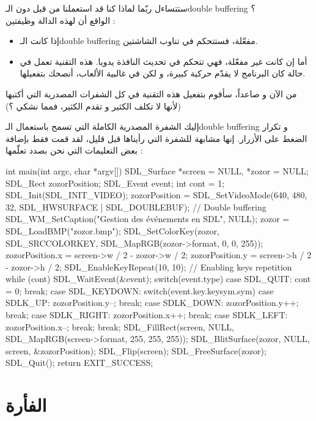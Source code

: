 ستتساءل ربّما لماذا كنا قد استعملنا
من قبل دون الـ\textenglish{double buffering} ؟\\
الواقع أن لهذه الدالة وظيفتين :

\begin{itemize}
	\item إذا كانت الـ\textenglish{double buffering}
	مفعّلة، فستتحكم في تناوب الشاشتين.
	\item أما إن كانت غير مفعّلة، فهي تتحكم في تحديث النافذة يدويا. هذه التقنية تعمل في حالة كان البرنامج لا يقدّم حركية كبيرة، و لكن في غالبية الألعاب، أنصحك بتفعيلها.
\end{itemize}

من الآن و صاعداً، سأقوم بتفعيل هذه التقنية في كل الشفرات المصدرية التي أكتبها (لأنها لا تكلف الكثير و تقدم الكثير، فمما نشكي ؟)

إليك الشفرة المصدرية الكاملة التي تسمح باستعمال الـ\textenglish{double buffering}
و تكرار الضغط على الأزرار. إنها مشابهة للشفرة التي رأيناها قبل قليل، لقد قمت فقط بإضافة بعض التعليمات التي نحن بصدد تعلّمها :

\begin{Csource}
int main(int argc, char *argv[])
{
	SDL_Surface *screen = NULL, *zozor = NULL;
	SDL_Rect zozorPosition;
	SDL_Event event;
	int cont = 1;
	SDL_Init(SDL_INIT_VIDEO);
	zozorPosition = SDL_SetVideoMode(640, 480, 32, SDL_HWSURFACE | SDL_DOUBLEBUF); // Double buffering
	SDL_WM_SetCaption("Gestion des événements en SDL", NULL);
	zozor = SDL_LoadBMP("zozor.bmp");
	SDL_SetColorKey(zozor, SDL_SRCCOLORKEY, SDL_MapRGB(zozor->format, 0, 0, 255));
	zozorPosition.x = screen->w / 2 - zozor->w / 2;
	zozorPosition.y = screen->h / 2 - zozor->h / 2;
	SDL_EnableKeyRepeat(10, 10); // Enabling keys repetition
	while (cont)
	{
		SDL_WaitEvent(&event);
		switch(event.type)
		{
			case SDL_QUIT:
			cont = 0;
			break;
			case SDL_KEYDOWN:
			switch(event.key.keysym.sym)
			{
				case SDLK_UP:
				zozorPosition.y--;
				break;
				case SDLK_DOWN:
				zozorPosition.y++;
				break;
				case SDLK_RIGHT:
				zozorPosition.x++;
				break;
				case SDLK_LEFT:
				zozorPosition.x--;
				break;
			}
			break;
		}
		SDL_FillRect(screen, NULL, SDL_MapRGB(screen->format, 255, 255, 255));
		SDL_BlitSurface(zozor, NULL, screen, &zozorPosition);
		SDL_Flip(screen);
	}
	SDL_FreeSurface(zozor);
	SDL_Quit();
	return EXIT_SUCCESS;
}
\end{Csource}

\section{الفأرة}

